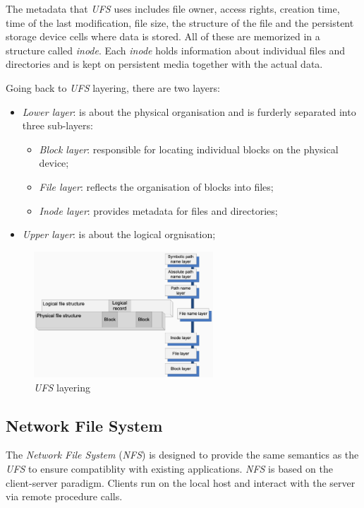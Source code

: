 The metadata that \emph{UFS} uses includes file owner, access rights, creation
time, time of the last modification, file size, the structure of the file and
the persistent storage device cells where data is stored. All of these are
memorized in a structure called \emph{inode}. Each \emph{inode} holds information
about individual files and directories and is kept on persistent media together
with the actual data.

\bigskip\noindent
Going back to \emph{UFS} layering, there are two layers:
\begin{itemize}
    \item \emph{Lower layer}: is about the physical organisation and is furderly
    separated into three sub-layers:
    \begin{itemize}
        \item \emph{Block layer}: responsible for locating individual blocks on
        the physical device;
        \item \emph{File layer}: reflects the organisation of blocks into files;
        \item \emph{Inode layer}: provides metadata for files and directories;
    \end{itemize}
    \item \emph{Upper layer}: is about the logical orgnisation;
\end{itemize}

\newpage
\begin{figure}[ht!]
    \centering
    \includegraphics[width=0.6\textwidth]{images/ufs-layering.png}
    \caption{\emph{UFS} layering}
\end{figure}

\subsection{Network File System}
The \emph{Network File System} (\emph{NFS}) is designed to provide the same
semantics as the \emph{UFS} to ensure compatiblity with existing applications.
\emph{NFS} is based on the client-server paradigm. Clients run on the local host
and interact with the server via remote procedure calls.

